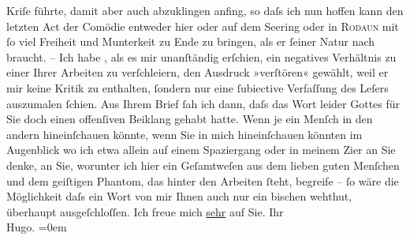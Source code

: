 \begin{ledgroupsized}[t]{13cm}
               Kriſe führte, damit aber auch abzuklingen anfing, so daſs ich nun hoffen kann den
               letzten Act der Comödie entweder
               hier oder auf dem Se{\geminationm}ering oder in \textsc{Rodaun} mit ſo viel Freiheit und Munterkeit zu Ende zu {\pb}bringen, als er ſeiner Natur nach
               braucht.\pend
           \pstart
           \numberlinefalse{}–\numberlinetrue{}\pend
           \pstart
           Ich habe \label{K_L01789_1v}\label{K_L01789_1h}, als es mir unanſtändig erſchien, ein negatives Verhältnis zu einer
               Ihrer Arbeiten zu verſchleiern,
               den Ausdruck »verſtören« gewählt, weil er mir keine Kritik zu enthalten, ſondern nur
               eine ſubiective Verfaſſung des Leſers auszumalen ſchien. Aus Ihrem Brief ſah ich
               dann, daſs das Wort leider Gottes für Sie doch einen offenſiven {\pb}Beiklang gehabt hatte.\pend
           \pstart
           Wenn je ein Menſch in den andern hineinſchauen könnte, wenn Sie in mich hineinſchauen
               könnten im Augenblick wo ich etwa allein auf einem Spaziergang oder in meinem Zi{\geminationm}er an Sie denke, an Sie, worunter ich hier ein
               Geſamtweſen aus dem lieben guten Menſchen und dem geiſtigen Phantom, das hinter den
               Arbeiten ſteht, begreife – ſo wäre die Möglichkeit daſs ein Wort von mir Ihnen auch
               nur ein bischen wehthut, überhaupt ausgeſchloſſen.\pend
           \pstart
           Ich freue mich \uline{sehr} auf Sie.\pend
           \pstart
           Ihr{\\[\baselineskip]}\spacefill\mbox{Hugo.}\pend
           \leftskip=0em{}\endnumbering{}\end{ledgroupsized}  \newcommand{\dateiname}{L01789}\newcommand{\titel}{Hugo von Hofmannsthal an Arthur Schnitzler, 14. 9. [1908]}\newcommand{\editorInnen}{Martin Anton Müller und Gerd-Hermann Susen}
      